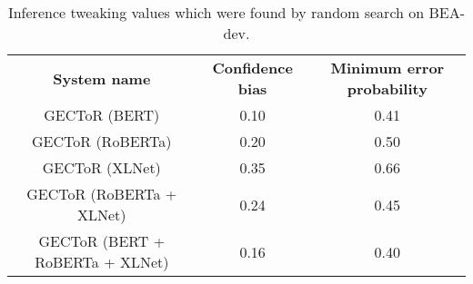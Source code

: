 \documentclass[11pt,a4paper]{article}
\begin{document}
\begin{table}[!hb]
\footnotesize
\centering
\begin{tabular}{ccc}
\hline
\textbf{System name} & \textbf{Confidence bias} & \textbf{Minimum error probability} \\ 
GECToR (BERT) & 0.10 & 0.41  \\ 
GECToR (RoBERTa) & 0.20 & 0.50  \\ 
GECToR (XLNet) & 0.35 & 0.66 \\ 
GECToR (RoBERTa + XLNet) & 0.24 & 0.45  \\ 
GECToR (BERT + RoBERTa + XLNet) & 0.16 & 0.40  \\ 
\hline
\end{tabular}
\caption{\label{hyperparameters-table} Inference tweaking values which were found by random search on BEA-dev.} 
\end{table}
\end{document}
